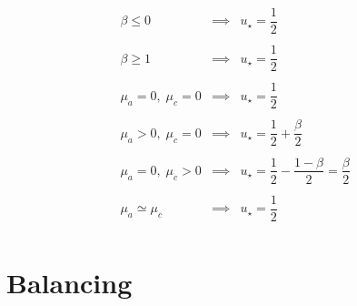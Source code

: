 \documentclass[aps,12pt]{revtex4}
\begin{document}
\begin{equation}
\begin{array}{lcl}
\beta \leq 0           & \implies & u_\star = \dfrac{1}{2}\\
\\
\beta \geq 1           & \implies & u_\star = \dfrac{1}{2}\\
\\
\mu_a = 0, \;\mu_c = 0 & \implies & u_\star = \dfrac{1}{2}\\
\\
\mu_a > 0, \;\mu_c = 0 & \implies & u_\star = \dfrac{1}{2} + \dfrac{\beta}{2} \\
\\
\mu_a = 0, \;\mu_c > 0 & \implies & u_\star = \dfrac{1}{2} - \dfrac{1-\beta}{2} = \dfrac{\beta}{2} \\
\\
\mu_a \simeq \mu_c & \implies & u_\star = \dfrac{1}{2} \\
\end{array}
\end{equation}

\section{Balancing}

 
\end{document}
